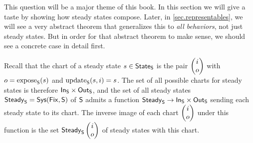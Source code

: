 \documentclass[DynamicalBook]{subfiles}
\begin{document}
{This question will be a major theme of this book. In this section we will give a
taste by showing how steady states compose. Later, in \cref{sec.representables}, we will see a very abstract
theorem that generalizes this to \emph{all behaviors}, not just steady states.
But in order for that abstract theorem to make sense, we should see a concrete
case in detail first.  

Recall that the chart of a steady state $s \in \mathsf{State}_{\mathsf{S}}$ is the pair
$\begin{pmatrix}{i} \\ {o} \end{pmatrix}$ with $o = \mathrm{expose}_{\mathsf{S}}(s)$ and $\mathrm{update}_{\mathsf{S}}(s, i) = s$. The set of all
possible charts for steady states is therefore $\mathsf{In}_{\mathsf{S}} \times \mathsf{Out}_{\mathsf{S}}$, and the
set of all steady states $\mathsf{Steady}_{\mathsf{S}} = \mathsf{Sys}(\mathsf{Fix}, \mathsf{S})$ of $\mathsf{S}$ admits a function
$\mathsf{Steady}_{\mathsf{S}} \to \mathsf{In}_{\mathsf{S}} \times \mathsf{Out}_{\mathsf{S}}$ sending each steady state to
its chart. The inverse image of each chart $\begin{pmatrix}{i} \\ {o} \end{pmatrix}$ under this function is
the set $\mathsf{Steady}_{\mathsf{S}}\begin{pmatrix}{i} \\ {o} \end{pmatrix}$ of steady states with this chart.

}
\end{document}
